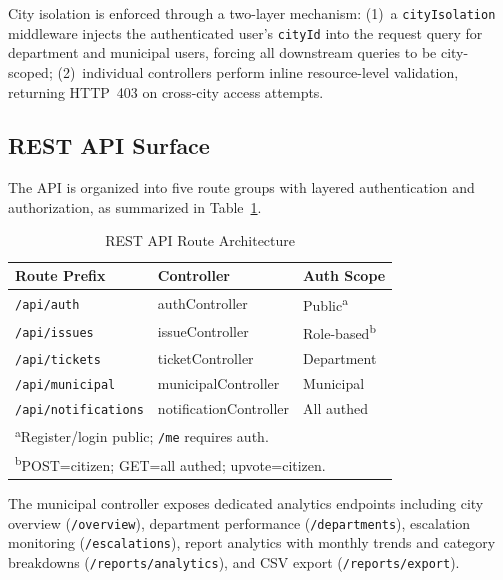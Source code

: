 \documentclass[conference]{IEEEtran}
\begin{document}
City isolation is enforced through a two-layer mechanism: (1)~a \texttt{cityIsolation} middleware injects the authenticated user's \texttt{cityId} into the request query for department and municipal users, forcing all downstream queries to be city-scoped; (2)~individual controllers perform inline resource-level validation, returning HTTP~403 on cross-city access attempts.

\subsection{REST API Surface}

The API is organized into five route groups with layered authentication and authorization, as summarized in Table~\ref{tab:api}.

\begin{table}[htbp]
\caption{REST API Route Architecture}
\begin{center}
\begin{tabular}{lll}
\toprule
\textbf{Route Prefix} & \textbf{Controller} & \textbf{Auth Scope} \\
\midrule
\texttt{/api/auth} & authController & Public\textsuperscript{a} \\
\texttt{/api/issues} & issueController & Role-based\textsuperscript{b} \\
\texttt{/api/tickets} & ticketController & Department \\
\texttt{/api/municipal} & municipalController & Municipal \\
\texttt{/api/notifications} & notificationController & All authed \\
\bottomrule
\multicolumn{3}{l}{\textsuperscript{a}\footnotesize{Register/login public; \texttt{/me} requires auth.}} \\
\multicolumn{3}{l}{\textsuperscript{b}\footnotesize{POST=citizen; GET=all authed; upvote=citizen.}} \\
\end{tabular}
\label{tab:api}
\end{center}
\end{table}

The municipal controller exposes dedicated analytics endpoints including city overview (\texttt{/overview}), department performance (\texttt{/departments}), escalation monitoring (\texttt{/escalations}), report analytics with monthly trends and category breakdowns (\texttt{/reports/analytics}), and CSV export (\texttt{/reports/export}).

\end{document}
